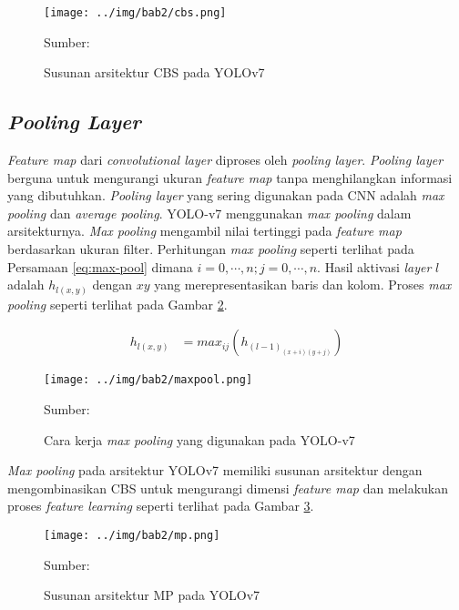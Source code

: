     \begin{figure}[H]
        \begin{center}
            \texttt{[image: ../img/bab2/cbs.png]}
            \caption{Susunan arsitektur CBS pada YOLOv7}
            \label{fig:cbs}
            Sumber: \citep{Wang2022}
        \end{center}
    \end{figure}

    \subsection{\textit{Pooling Layer}}
    \textit{Feature map} dari \textit{convolutional layer} diproses oleh \textit{pooling layer}. \textit{Pooling layer} berguna untuk mengurangi ukuran \textit{feature map} tanpa menghilangkan informasi yang dibutuhkan. \textit{Pooling layer} yang sering digunakan pada CNN adalah \textit{max pooling} dan \textit{average pooling}. YOLO-v7 menggunakan \textit{max pooling} dalam arsitekturnya. \textit{Max pooling} mengambil nilai tertinggi pada \textit{feature map} berdasarkan ukuran filter. Perhitungan \textit{max pooling} seperti terlihat pada Persamaan \ref{eq:max-pool} dimana $i=0, \cdots, n;j=0, \cdots, n$. Hasil aktivasi \textit{layer} $l$ adalah $h_{l(x,y)}$ dengan $xy$ yang merepresentasikan baris dan kolom. Proses \textit{max pooling} seperti terlihat pada Gambar \ref{fig:max-pool}.

    \begin{align}
        \label{eq:max-pool}
        h_{l(x,y)} &= max_{ij}(h_{(l-1)_{(x+i)(y+j)}})
    \end{align}

    \begin{figure}[H]
        \centering
        \texttt{[image: ../img/bab2/maxpool.png]}
        \caption{Cara kerja \textit{max pooling} yang digunakan pada YOLO-v7}
        \label{fig:max-pool}
        Sumber: \citep{Yani2019}
    \end{figure}

    \textit{Max pooling} pada arsitektur YOLOv7 memiliki susunan arsitektur dengan mengombinasikan CBS untuk mengurangi dimensi \textit{feature map} dan melakukan proses \textit{feature learning} seperti terlihat pada Gambar \ref{fig:mp}.

    \begin{figure}[H]
        \begin{center}
            \texttt{[image: ../img/bab2/mp.png]}
            \caption{Susunan arsitektur MP pada YOLOv7}
            \label{fig:mp}
            Sumber: \citep{Wang2022}
        \end{center}
    \end{figure}

